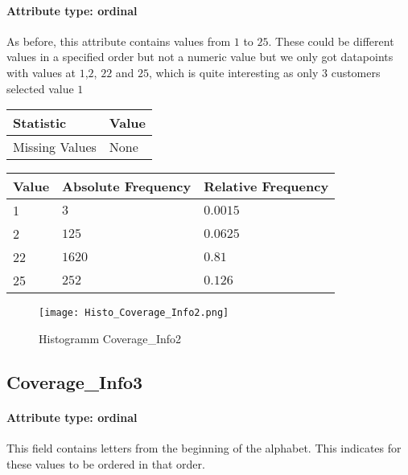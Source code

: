 \paragraph{Attribute type: ordinal}As before, this attribute contains values from $1$ to $25$.  These could be different values in a specified order but not a numeric value but we only got datapoints with values at $1$,$2$, $22$ and $25$, which is quite interesting as only $3$ customers selected value $1$

\begin{table}[H]
	\renewcommand{\arraystretch}{1.25}
	\begin{tabular}{l|l}
		\textbf{Statistic} & \textbf{Value}\\\hline
		Missing Values& None\\\hline
	\end{tabular}
\end{table}
\begin{table}[H]
	\renewcommand{\arraystretch}{1.25}
	\begin{tabular}{l|l|l}
		\textbf{Value} & \textbf{Absolute Frequency} & \textbf{Relative Frequency}\\\hline
		1&$3$&$0.0015$\\\hline
		2&$125$&$0.0625$\\\hline
		22&$1620$&$0.81$\\\hline
		25&$252$&$0.126$\\\hline
	\end{tabular}
\end{table}

\begin{figure}[H]
	\begin{center}
		\texttt{[image: Histo\_Coverage\_Info2.png]}
	\end{center}
	\caption{Histogramm Coverage\_Info2}
\end{figure}

\subsection{Coverage\_Info3}
\paragraph{Attribute type: ordinal} This field contains letters from the beginning of the alphabet. This indicates for these values to be ordered in that order.

